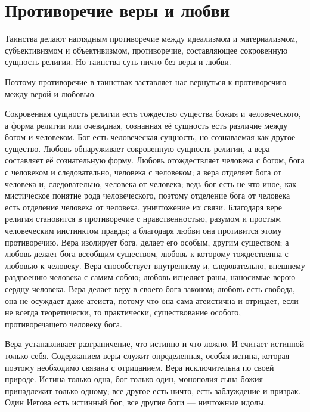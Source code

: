 \documentclass[12pt,oneside]{book}
\begin{document}
\chapter{Противоречие веры и любви}


Таинства делают наглядным противоречие между идеализмом и материализмом, субъективизмом и объективизмом, противоречие, составляющее сокровенную сущность религии. Но таинства суть ничто без веры и любви.

Поэтому противоречие в таинствах заставляет нас вернуться к противоречию между верой и любовью.

Сокровенная сущность религии есть тождество существа божия и человеческого, а форма религии или очевидная, сознанная её сущность есть различие между богом и человеком. Бог есть человеческая сущность, но сознаваемая как другое существо. Любовь обнаруживает сокровенную сущность религии, а вера составляет её сознательную форму. Любовь отождествляет человека с богом, бога с человеком и следовательно, человека с человеком; а вера отделяет бога от человека и, следовательно, человека от человека; ведь бог есть не что иное, как мистическое понятие рода человеческого, поэтому отделение бога от человека есть отделение человека от человека, уничтожение их связи. Благодаря вере религия становится в противоречие с нравственностью, разумом и простым человеческим инстинктом правды; а благодаря любви она противится этому противоречию. Вера изолирует бога, делает его особым, другим существом; а любовь делает бога всеобщим существом, любовь к которому тождественна с любовью к человеку. Вера способствует внутреннему и, следовательно, внешнему раздвоению человека с самим собою; любовь исцеляет раны, наносимые верою сердцу человека. Вера делает веру в своего бога законом; любовь есть свобода, она не осуждает даже атеиста, потому что она сама атеистична и отрицает, если не всегда теоретически, то практически, существование особого, противоречащего человеку бога.

Вера устанавливает разграничение, что истинно и что ложно. И считает истинной только себя. Содержанием веры служит определенная, особая истина, которая поэтому необходимо связана с отрицанием. Вера исключительна по своей природе. Истина только одна, бог только один, монополия сына божия принадлежит только одному; все другое есть ничто, есть заблуждение и призрак. Один Иегова есть истинный бог; все другие боги --- ничтожные идолы.
\end{document}
